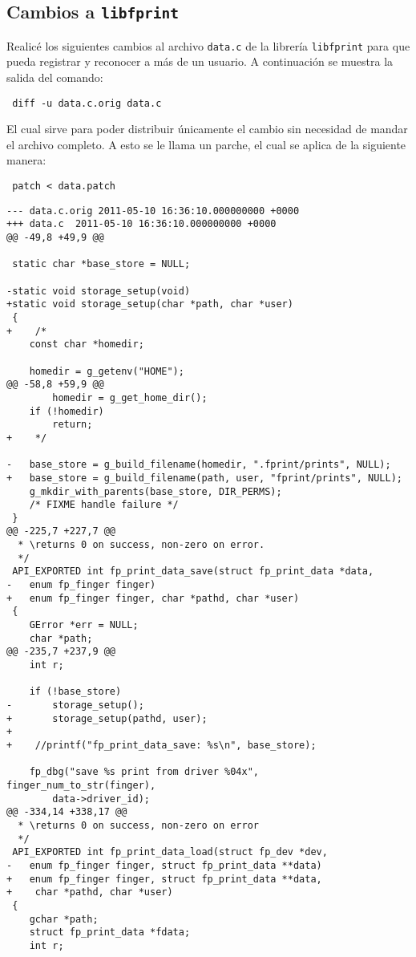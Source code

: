 \begin{appendices}

\chapter{Cambios a \texttt{libfprint}}

Realicé los siguientes cambios al archivo \texttt{data.c} de la librería \texttt{libfprint} para que pueda registrar y reconocer a más de un usuario. A continuación se muestra la salida del comando:

\begin{Verbatim}
 diff -u data.c.orig data.c
\end{Verbatim}

El cual sirve para poder distribuir únicamente el cambio sin necesidad de mandar el archivo completo. A esto se le llama un parche, el cual se aplica de la siguiente manera:

\begin{Verbatim}
 patch < data.patch
\end{Verbatim}


\begin{Verbatim}[fontsize=\small]
--- data.c.orig	2011-05-10 16:36:10.000000000 +0000
+++ data.c	2011-05-10 16:36:10.000000000 +0000
@@ -49,8 +49,9 @@
 
 static char *base_store = NULL;
 
-static void storage_setup(void)
+static void storage_setup(char *path, char *user)
 {
+    /*
 	const char *homedir;
 
 	homedir = g_getenv("HOME");
@@ -58,8 +59,9 @@
 		homedir = g_get_home_dir();
 	if (!homedir)
 		return;
+    */
 
-	base_store = g_build_filename(homedir, ".fprint/prints", NULL);
+	base_store = g_build_filename(path, user, "fprint/prints", NULL);
 	g_mkdir_with_parents(base_store, DIR_PERMS);
 	/* FIXME handle failure */
 }
@@ -225,7 +227,7 @@
  * \returns 0 on success, non-zero on error.
  */
 API_EXPORTED int fp_print_data_save(struct fp_print_data *data,
-	enum fp_finger finger)
+	enum fp_finger finger, char *pathd, char *user)
 {
 	GError *err = NULL;
 	char *path;
@@ -235,7 +237,9 @@
 	int r;
 
 	if (!base_store)
-		storage_setup();
+		storage_setup(pathd, user);
+
+    //printf("fp_print_data_save: %s\n", base_store);
 
 	fp_dbg("save %s print from driver %04x", finger_num_to_str(finger),
 		data->driver_id);
@@ -334,14 +338,17 @@
  * \returns 0 on success, non-zero on error
  */
 API_EXPORTED int fp_print_data_load(struct fp_dev *dev,
-	enum fp_finger finger, struct fp_print_data **data)
+	enum fp_finger finger, struct fp_print_data **data,
+    char *pathd, char *user)
 {
 	gchar *path;
 	struct fp_print_data *fdata;
 	int r;
 

\end{Verbatim}
\end{appendices}
